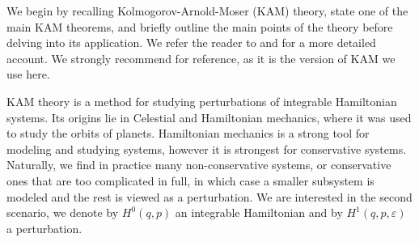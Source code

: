 
We begin by recalling Kolmogorov-Arnold-Moser (KAM) theory, state one of the main KAM theorems, and briefly outline the main points of the theory before delving into its application. We refer the reader to \cite{Knauf_2018} and \cite{Seri_2022} for a more detailed account. We strongly recommend \cite{poschel82} for reference, as it is the version of KAM we use here. 


KAM theory is a method for studying perturbations of integrable Hamiltonian systems. Its origins lie in Celestial and Hamiltonian mechanics, where it was used to study the orbits of planets. Hamiltonian mechanics is a strong tool for modeling and studying systems, however it is strongest for conservative systems. Naturally, we find in practice many non-conservative systems, or conservative ones that are too complicated in full, in which case a smaller subsystem is modeled and the rest is viewed as a perturbation. We are interested in the second scenario, we denote by $H^0(q,p)$ an integrable Hamiltonian and by $H^1(q,p,\varepsilon)$ a perturbation. 

